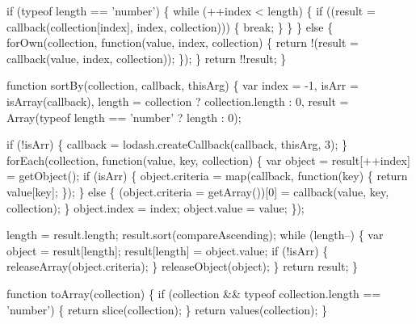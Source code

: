 \begin{DoxyCodeInclude}
      \textcolor{keywordflow}{if} (typeof length == \textcolor{stringliteral}{'number'}) \{
        \textcolor{keywordflow}{while} (++index < length) \{
          \textcolor{keywordflow}{if} ((result = callback(collection[index], index, collection))) \{
            \textcolor{keywordflow}{break};
          \}
        \}
      \} \textcolor{keywordflow}{else} \{
        forOwn(collection, \textcolor{keyword}{function}(value, index, collection) \{
          \textcolor{keywordflow}{return} !(result = callback(value, index, collection));
        \});
      \}
      \textcolor{keywordflow}{return} !!result;
    \}

    \textcolor{keyword}{function} sortBy(collection, callback, thisArg) \{
      var index = -1,
          isArr = isArray(callback),
          length = collection ? collection.length : 0,
          result = Array(typeof length == \textcolor{stringliteral}{'number'} ? length : 0);

      \textcolor{keywordflow}{if} (!isArr) \{
        callback = lodash.createCallback(callback, thisArg, 3);
      \}
      forEach(collection, \textcolor{keyword}{function}(value, key, collection) \{
        var \textcolor{keywordtype}{object} = result[++index] = getObject();
        \textcolor{keywordflow}{if} (isArr) \{
          \textcolor{keywordtype}{object}.criteria = map(callback, \textcolor{keyword}{function}(key) \{ \textcolor{keywordflow}{return} value[key]; \});
        \} \textcolor{keywordflow}{else} \{
          (\textcolor{keywordtype}{object}.criteria = getArray())[0] = callback(value, key, collection);
        \}
        \textcolor{keywordtype}{object}.index = index;
        \textcolor{keywordtype}{object}.value = value;
      \});

      length = result.length;
      result.sort(compareAscending);
      \textcolor{keywordflow}{while} (length--) \{
        var \textcolor{keywordtype}{object} = result[length];
        result[length] = \textcolor{keywordtype}{object}.value;
        \textcolor{keywordflow}{if} (!isArr) \{
          releaseArray(\textcolor{keywordtype}{object}.criteria);
        \}
        releaseObject(\textcolor{keywordtype}{object});
      \}
      \textcolor{keywordflow}{return} result;
    \}

    \textcolor{keyword}{function} toArray(collection) \{
      \textcolor{keywordflow}{if} (collection && typeof collection.length == \textcolor{stringliteral}{'number'}) \{
        \textcolor{keywordflow}{return} slice(collection);
      \}
      \textcolor{keywordflow}{return} values(collection);
    \}


\end{DoxyCodeInclude}
